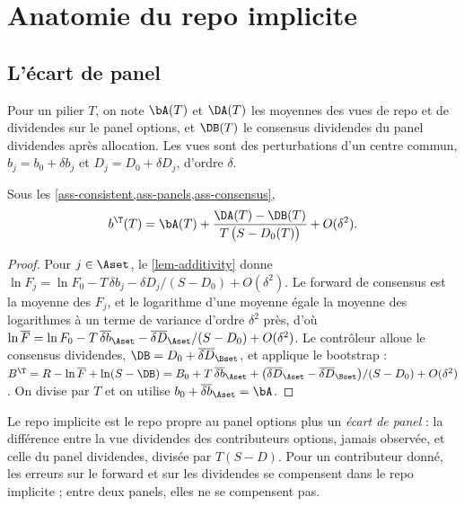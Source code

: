 \section{Anatomie du repo implicite}\label{sec-anatomy}

\subsection{L'écart de panel}
Pour un pilier $T$, on note $\bA(T)$ et $\DA(T)$ les moyennes des vues de repo et de dividendes sur le panel options,
et $\DB(T)$ le consensus dividendes du panel dividendes après allocation. Les vues sont des perturbations d'un centre
commun, $b_j=b_0+\delta b_j$ et $D_j=D_0+\delta D_j$, d'ordre $\delta$.

\begin{proposition}\label{prop-gap}
Sous les \cref{ass-consistent,ass-panels,ass-consensus},
\begin{equation}\label{eq-gap}
b^\T(T)=\bA(T)+\frac{\DA(T)-\DB(T)}{T\,\bigl(S-D_0(T)\bigr)}+O(\delta^2).
\end{equation}
\end{proposition}
\begin{proof}
Pour $j\in\Aset$, le \cref{lem-additivity} donne $\ln F_j=\ln F_0-T\,\delta b_j-\delta D_j/(S-D_0)+O(\delta^2)$. Le
forward de consensus est la moyenne des $F_j$, et le logarithme d'une moyenne égale la moyenne des logarithmes à un
terme de variance d'ordre $\delta^2$ près, d'où
$\ln\overline{F}=\ln F_0-T\,\overline{\delta b}_{\Aset}-\overline{\delta D}_{\Aset}/(S-D_0)+O(\delta^2)$. Le contrôleur
alloue le consensus dividendes, $\DB=D_0+\overline{\delta D}_{\Bset}$, et applique le bootstrap :
$B^\T=R-\ln\overline{F}+\ln(S-\DB)
=B_0+T\,\overline{\delta b}_{\Aset}+\bigl(\overline{\delta D}_{\Aset}-\overline{\delta D}_{\Bset}\bigr)/(S-D_0)+O(\delta^2)$.
On divise par $T$ et on utilise $b_0+\overline{\delta b}_{\Aset}=\bA$.
\end{proof}

Le repo implicite est le repo propre au panel options plus un \emph{écart de panel} : la différence entre la vue
dividendes des contributeurs options, jamais observée, et celle du panel dividendes, divisée par $T(S-D)$. Pour un
contributeur donné, les erreurs sur le forward et sur les dividendes se compensent dans le repo implicite ; entre deux
panels, elles ne se compensent pas.

